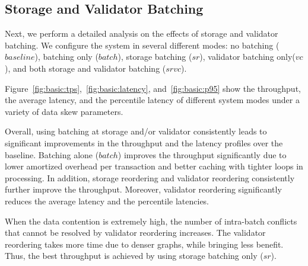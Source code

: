 \subsection{Storage and Validator Batching}
\label{subsec:experiment:batching}

Next, we perform a detailed analysis on the effects of storage and validator batching. We configure the system in several different modes: no batching ($baseline$), batching only ($batch$), storage batching ($sr$), validator batching only($vc$), and both storage and validator batching ($srvc$).




Figure~\ref{fig:basic:tps},~\ref{fig:basic:latency}, and~\ref{fig:basic:p95} show the throughput, the average latency, and the percentile latency of different system modes under a variety of data skew parameters. 

Overall, using batching at storage and/or validator consistently leads to significant improvements in the throughput and the latency profiles over the baseline. Batching alone ($batch$) improves the throughput significantly due to lower amortized overhead per transaction and better caching with tighter loops in processing. In addition, storage reordering and validator reordering consistently further improve the throughput. Moreover, validator reordering significantly reduces the average latency and the percentile latencies.


When the data contention is extremely high, the number of intra-batch conflicts that cannot be resolved by validator reordering increases. The validator reordering takes more time due to denser graphs, while bringing less benefit. Thus, the best throughput is achieved by using storage batching only ($sr$). 

